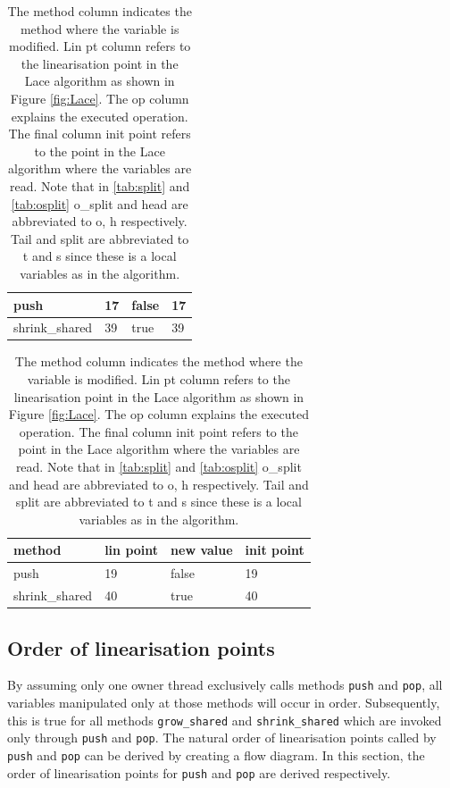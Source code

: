 \documentclass{sig-alternate-br}
\begin{document}
\begin{table}[h]
\begin{subtable}[h]{0.45\textwidth}
\begin{tabular}{|l|l|l|l|}
			push            & 17                 & false       & 17                  \\ \hline
			shrink\_shared  & 39                 & true        & 39               \\ \hline
		\end{tabular}
		\caption{Linearisation points of allstolen variable}
		\label{tab:allst}
	\end{subtable}
	\begin{subtable}[h]{0.45\textwidth}
		\centering
		\begin{tabular}{|l|l|l|l|}
			\hline
			\textbf{method} & \textbf{lin point} & \textbf{new value} & \textbf{init point} \\ \hline
			push            & 19                 & false       & 19                 \\ \hline
			shrink\_shared  & 40                 & true        & 40            \\ \hline
		\end{tabular}
		\caption{Linearisation points of o\_allstolen variable}
		\label{tab:oallst}
	\end{subtable}
	\caption{The method column indicates the method where the variable is modified. Lin pt column refers to the linearisation point in the Lace algorithm as shown in Figure \ref{fig:Lace}. The op column explains the executed operation. The final column init point refers to the point in the Lace algorithm where the variables are read. Note that in \ref{tab:split} and \ref{tab:osplit} o\_split and head are abbreviated to o, h respectively. Tail and split are abbreviated to t and s since these is a local variables as in the algorithm.}
\end{table}

\subsection{Order of linearisation points}
By assuming only one owner thread exclusively calls methods \texttt{push} and \texttt{pop}, all variables manipulated only at those methods will occur in order.
Subsequently, this is true for all methods \texttt{grow\_shared} and \texttt{shrink\_shared} which are invoked only through \texttt{push} and \texttt{pop}.
The natural order of linearisation points called by \texttt{push} and \texttt{pop} can be derived by creating a flow diagram.
In this section, the order of linearisation points for \texttt{push} and \texttt{pop} are derived respectively.
\end{document}
